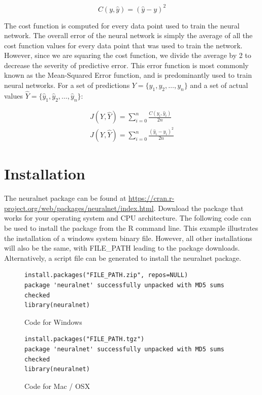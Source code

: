 \documentclass[11pt]{article}
\begin{document}
\begin{equation*}
C(y,\hat y)=(\hat y - y)^2
\end{equation*}

The cost function is computed for every data point used to train the neural network. The overall error of the neural network is simply the average of all the cost function values for every data point that was used to train the network. However, since we are squaring the cost function, we divide the average by 2 to decrease the severity of predictive error. This error function is most commonly known as the Mean-Squared Error function, and is predominantly used to train neural networks. For a set of predictions $Y=\{y_1,y_2,\hdots,y_n\}$ and a set of actual values $\hat Y=\{\hat y_1,\hat y_2,\hdots,\hat y_n\}$:

\begin{gather*}
J(Y,\hat Y)=\sum_{i=0}^{n} \frac{C(y_i,\hat y_i)}{2n} \\
J(Y,\hat Y)=\sum_{i=0}^{n} \frac{(\hat y_i - y_i)^2}{2n}
\end{gather*}

\section{Installation}

The neuralnet package can be found at \url{https://cran.r-project.org/web/packages/neuralnet/index.html}. Download the package that works for your operating system and CPU architecture. The following code can be used to install the package from the R command line. This example illustrates the installation of a windows system binary file. However, all other installations will also be the same, with FILE\_PATH leading to the package downloads. Alternatively, a script file can be generated to install the neuralnet package. 
\begin{figure}[H]
\caption{Code for Windows}
\begin{lstlisting}
install.packages("FILE_PATH.zip", repos=NULL)
package 'neuralnet' successfully unpacked with MD5 sums checked
library(neuralnet)
\end{lstlisting}
\end{figure}

\begin{figure}[H]
\caption{Code for Mac / OSX}
\begin{lstlisting}
install.packages("FILE_PATH.tgz")
package 'neuralnet' successfully unpacked with MD5 sums checked
library(neuralnet)
\end{lstlisting}
\end{figure}
\end{document}
